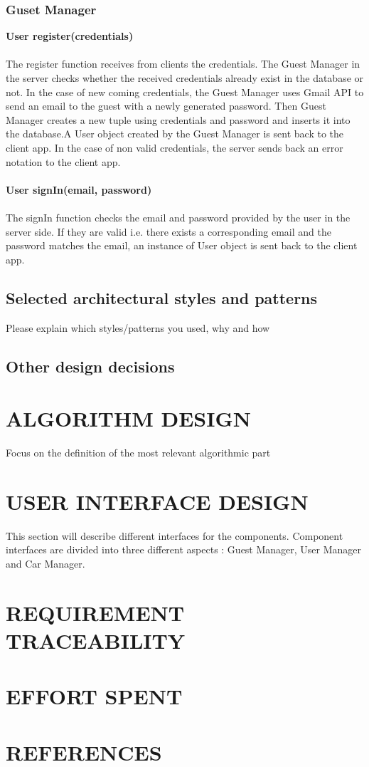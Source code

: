 \documentclass{article}
\begin{document}
	\subsubsection{Guset Manager}
	\textbf{User register(credentials)}
	\\
	\\The register function receives from clients the credentials. The Guest Manager in the server checks whether the received credentials already exist in the database or not. In the case of new coming credentials, the Guest Manager uses Gmail API to send an email to the guest with a newly generated password. Then Guest Manager creates a new tuple using credentials and password and inserts it into the database.A User object created by the Guest Manager is sent back to the client app. In the case of non valid credentials, the server sends back an error notation to the client app.
	\\
	\\\textbf{User signIn(email, password)}
	\\
	\\The signIn function checks the email and password provided by the user in the server side. If they are valid i.e. there exists a corresponding email and the password matches the email, an instance of User object is sent back to the client app.
	\subsection{Selected architectural styles and patterns}
	Please explain which styles/patterns you used, why and how
	\subsection{Other design decisions}
	\newpage
	\section{ALGORITHM DESIGN}
	Focus on the definition of the most relevant algorithmic part
	\newpage
	\section{USER INTERFACE DESIGN}
	This section will describe different interfaces for the components. Component interfaces are divided into three different aspects : Guest Manager, User Manager and Car Manager.
	
	\newpage
	\section{REQUIREMENT TRACEABILITY}
	\newpage
	\section{EFFORT SPENT}
	\newpage
	\section{REFERENCES}
\end{document}

